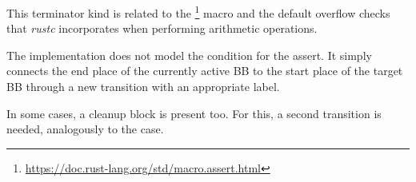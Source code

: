 This terminator kind is related to the
\footnote{\url{https://doc.rust-lang.org/std/macro.assert.html}}
macro and the default overflow checks that \emph{rustc} incorporates when
performing arithmetic operations.

The implementation does not model the condition for the assert.
It simply connects the end place of the currently active \acrshort{BB}
to the start place of the target \acrshort{BB}
through a new transition with an appropriate label.

In some cases, a cleanup block is present too.
For this, a second transition is needed, analogously to the  case.